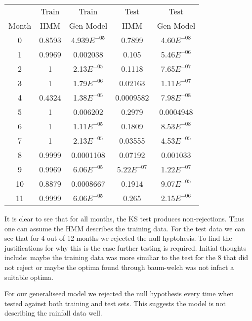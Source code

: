 \begin{center}
    \begin{tabular}{c c c c c}
              &  Train & Train     & Test &  Test \\	
        Month &	HMM	   & Gen Model & HMM  &	 Gen Model\\
        0	    &   0.8593	&   4.939$E^{-05}$	&   0.7899	    &       4.60$E^{-08}$   \\
        1	    &   0.9969	&   0.002038	&       0.105	    &       5.46$E^{-06}$   \\
        2	    &   1	    &   2.13$E^{-05}$	&   0.1118	    &       7.65$E^{-07}$   \\
        3	    &   1	    &   1.79$E^{-06}$	&   0.02163	    &       1.11$E^{-07}$   \\
        4	    &   0.4324	&   1.38$E^{-05}$	&   0.0009582	&       7.98$E^{-08}$   \\
        5	    &   1	    &   0.006202	&       0.2979	    &       0.0004948  \\
        6	    &   1	    &   1.11$E^{-05}$	&   0.1809	    &       8.53$E^{-08}$   \\
        7	    &   1	    &   2.13$E^{-05}$	&   0.03555	    &       4.53$E^{-05}$   \\
        8	    &   0.9999	&   0.0001108	&       0.07192	    &       0.001033   \\
        9	    &   0.9969	&   6.06$E^{-05}$	&   5.22$E^{-07}$	&   1.22$E^{-07}$   \\
        10	    &   0.8879	&   0.0008667	&       0.1914	    &       9.07$E^{-05}$   \\
        11	    &   0.9999	&   6.06$E^{-05}$	&   0.265	    &       2.15$E^{-06}$   

    \end{tabular}
\end{center}


It is clear to see that for all months, the KS test produces non-rejections. Thus one can assume the HMM describes the training data. For the test data we can see that for 4 out of 12 months we rejected the null hyptohesis. To find the justifications for why this is the case further testing is required. Initial thoughts include: maybe the training data was more similiar to the test for the 8 that did not reject or maybe the optima found through baum-welch was not infact a suitable optima. 

For our generaliseed model we rejected the null hypothesis every time when tested against both training and test sets. This suggests the model is not describing the rainfall data well. 